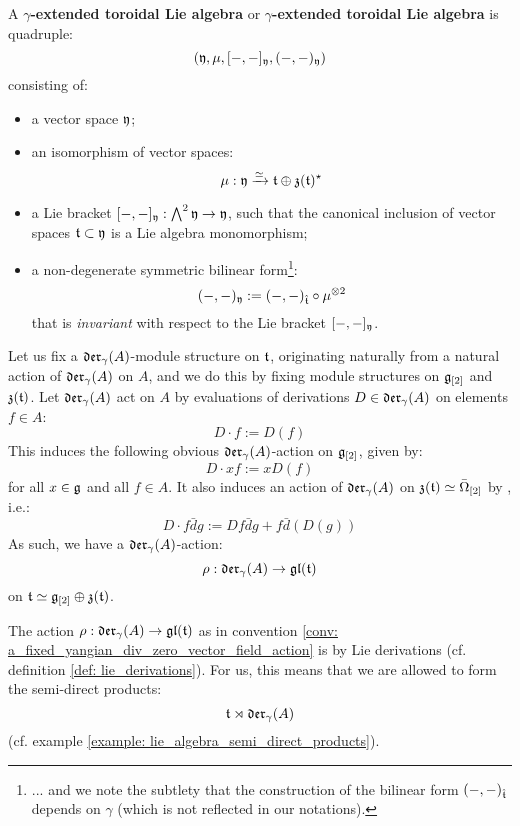         \begin{definition} \label{def: yangian_extended_toroidal_lie_algebras}
            A \textbf{$\gamma$-extended toroidal Lie algebra} or \textbf{$\gamma$-extended toroidal Lie algebra} is quadruple:
                $$(\mathfrak{y}, \mu, [-, -]_{\mathfrak{y}}, (-, -)_{\mathfrak{y}})$$
            consisting of:
            \begin{itemize}
                \item a vector space $\mathfrak{y}$;
                \item an isomorphism of vector spaces:
                    $$\mu: \mathfrak{y} \xrightarrow[]{\simeq} \mathfrak{t} \oplus \mathfrak{z}(\mathfrak{t})^{\star}$$
                \item a Lie bracket $[-, -]_{\mathfrak{y}}: \bigwedge^2 \mathfrak{y} \to \mathfrak{y}$, such that the canonical inclusion of vector spaces $\mathfrak{t} \subset \mathfrak{y}$ is a Lie algebra monomorphism;
                \item a non-degenerate symmetric bilinear form\footnote{... and we note the subtlety that the construction of the bilinear form $(-, -)_{\hat{\mathfrak{t}}}$ depends on $\gamma$ (which is not reflected in our notations).}:
                    $$(-, -)_{\fraky} := (-, -)_{\extendedtoroidal} \circ \mu^{\tensor 2}$$
                that is \textit{invariant} with respect to the Lie bracket $[-, -]_{\mathfrak{y}}$.
            \end{itemize}
        \end{definition}

        \begin{convention} \label{conv: a_fixed_yangian_div_zero_vector_field_action} 
            Let us fix a $\mathfrak{der}_{\gamma}(A)$-module structure on $\mathfrak{t}$, originating naturally from a natural action of $\mathfrak{der}_{\gamma}(A)$ on $A$, and we do this by fixing module structures on $\mathfrak{g}_{[2]}$ and $\mathfrak{z}(\mathfrak{t})$. Let $\mathfrak{der}_{\gamma}(A)$ act on $A$ by evaluations of derivations $D \in \mathfrak{der}_{\gamma}(A)$ on elements $f \in A$:
                $$D \cdot f := D(f)$$
            This induces the following obvious $\mathfrak{der}_{\gamma}(A)$-action on $\mathfrak{g}_{[2]}$, given by:
                $$D \cdot xf := x D(f)$$
            for all $x \in \mathfrak{g}$ and all $f \in A$. It also induces an action of $\mathfrak{der}_{\gamma}(A)$ on $\mathfrak{z}(\mathfrak{t}) \simeq \bar{\Omega}_{[2]}$ by , i.e.:
                $$D \cdot f\bar{d}g := Df \bar{d}g + f \bar{d}(D(g))$$
            As such, we have a $\mathfrak{der}_{\gamma}(A)$-action:
                $$\rho: \mathfrak{der}_{\gamma}(A) \to \mathfrak{gl}(\mathfrak{t})$$
            on $\mathfrak{t} \simeq \mathfrak{g}_{[2]} \oplus \mathfrak{z}(\mathfrak{t})$.
        \end{convention}
        \begin{remark}
            The action $\rho: \mathfrak{der}_{\gamma}(A) \to \mathfrak{gl}(\mathfrak{t})$ as in convention \ref{conv: a_fixed_yangian_div_zero_vector_field_action} is by Lie derivations (cf. definition \ref{def: lie_derivations}). For us, this means that we are allowed to form the semi-direct products:
                $$\mathfrak{t} \rtimes \mathfrak{der}_{\gamma}(A)$$
            (cf. example \ref{example: lie_algebra_semi_direct_products}).
        \end{remark}

